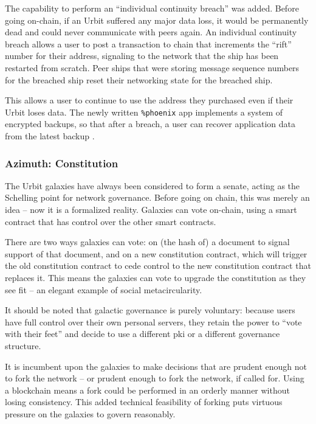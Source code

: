 \documentclass[twoside]{article}
\begin{document}
\sloppy
The capability to perform an ``individual continuity breach'' was added.  Before going on-chain, if an Urbit suffered any major data loss, it would be permanently dead and could never communicate with peers again.  An individual continuity breach allows a user to post a transaction to chain that increments the ``rift'' number for their address, signaling to the network that the ship has been restarted from scratch.  Peer ships that were storing message sequence numbers for the breached ship reset their networking state for the breached ship.

\sloppy
This allows a user to continue to use the address they purchased even if their Urbit loses data.  The newly written \lstinline[style=inlinecode]{%phoenix} app implements a system of encrypted backups, so that after a breach, a user can recover application data from the latest backup \citep{Wilson2024}.

\subsubsection{Azimuth: Constitution}

\sloppy
The Urbit galaxies have always been considered to form a senate, acting as the Schelling point for network governance.  Before going on chain, this was merely an idea – now it is a formalized reality.  Galaxies can vote on-chain, using a smart contract that has control over the other smart contracts.

There are two ways galaxies can vote: on (the hash of) a document to signal support of that document, and on a new constitution contract, which will trigger the old constitution contract to cede control to the new constitution contract that replaces it.  This means the galaxies can vote to upgrade the constitution as they see fit – an elegant example of social meta\-circularity.

It should be noted that galactic governance is purely voluntary: because users have full control over their own personal servers, they retain the power to ``vote with their feet'' and decide to use a different {\sc pki} or a different governance structure.

It is incumbent upon the galaxies to make decisions that are prudent enough not to fork the network – or prudent enough to fork the network, if called for.  Using a blockchain means a fork could be performed in an orderly manner without losing consistency.  This added technical feasibility of forking puts virtuous pressure on the galaxies to govern reasonably.
\end{document}
